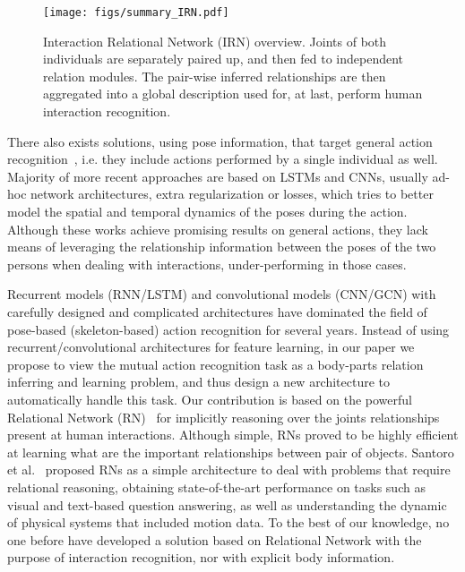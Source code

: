 \documentclass[journal,twoside]{IEEEtran}
\begin{document}
\begin{figure}[!tp]
	\centering
	\texttt{[image: figs/summary\_IRN.pdf]}
	\caption{Interaction Relational Network (IRN) overview. Joints of both individuals are separately paired up, and then fed to independent relation modules. The pair-wise inferred relationships are then aggregated into a global description used for, at last, perform human interaction recognition.}
	\label{fig:summarized_pipeline}
\end{figure}

There also exists solutions, using pose information, that target general action recognition~\cite{Du2015,Zhu2016a,Liu2016a,Cai2016,Yang2017,Liu2018,Ke2018a,Ke2019,Liu2019d}, i.e. they include actions performed by a single individual as well. 
Majority of more recent approaches are based on LSTMs and CNNs, usually ad-hoc network architectures, extra regularization or losses, which tries to better model the spatial and temporal dynamics of the poses during the action.
Although these works achieve promising results on general actions, they lack means of leveraging the relationship information between the poses of the two persons when dealing with interactions, under-performing in those cases.

Recurrent models (RNN/LSTM) and convolutional models (CNN/GCN) with carefully designed and complicated architectures have dominated the field of pose-based (skeleton-based) action recognition for several years. 
Instead of using recurrent/convolutional architectures for feature learning, in our paper we propose to view the mutual action recognition task as a body-parts relation inferring and learning problem, and thus design a new architecture to automatically handle this task.
Our contribution is based on the powerful Relational Network (RN)~\cite{Santoro2017} for implicitly reasoning over the joints relationships present at human interactions. 
Although simple, RNs proved to be highly efficient at learning what are the important relationships between pair of objects.
Santoro et al.~\cite{Santoro2017} proposed RNs as a simple architecture to deal with problems that require relational reasoning, obtaining state-of-the-art performance on tasks such as visual and text-based question answering, as well as understanding the dynamic of physical systems that included motion data.
To the best of our knowledge, no one before have developed a solution based on Relational Network with the purpose of interaction recognition, nor with explicit body information.
\end{document}
